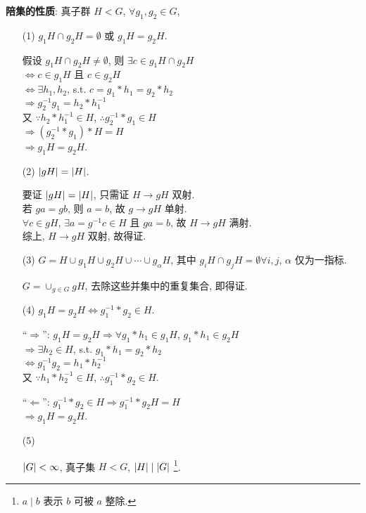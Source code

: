 \documentclass{note}
\begin{document}
\textbf{陪集的性质}: 真子群 $H<G$, $\forall g_1,g_2\in G$,
\begin{itemize}
    \item[(1)] $g_1H\cap g_2H=\emptyset$ 或 $g_1H=g_2H$.
    \begin{pf}
        假设 $g_1H\cap g_2H\neq\emptyset$, 则 $\exists c\in g_1H\cap g_2H$\\
        $\Longleftrightarrow c\in g_1H$ 且 $c\in g_2H$\\
        $\Longleftrightarrow\exists h_1,h_2$, s.t. $c=g_1*h_1=g_2*h_2$\\
        $\Longrightarrow g_2^{-1}g_1=h_2*h_1^{-1}$\\
        又 $\because h_2*h_1^{-1}\in H$, $\therefore g_2^{-1}*g_1\in H$\\
        $\Longrightarrow(g_2^{-1}*g_1)*H=H$\\
        $\Longrightarrow g_1H=g_2H$.
    \end{pf}
    \item[(2)] $\left\lvert gH\right\rvert=\left\lvert H\right\rvert$.
    \begin{pf}
        要证 $\left\lvert gH\right\rvert=\left\lvert H\right\rvert$, 只需证 $H\rightarrow gH$ 双射.\\
        若 $ga=gb$, 则 $a=b$, 故 $g\rightarrow gH$ 单射.\\
        $\forall c\in gH$, $\exists a=g^{-1}c\in H$ 且 $ga=b$, 故 $H\rightarrow gH$ 满射.\\
        综上, $H\rightarrow gH$ 双射, 故得证.
    \end{pf}
    \item[(3)] $G=H\cup g_1H\cup g_2H\cup\cdots\cup g_{\alpha}H$, 其中 $g_iH\cap g_jH=\emptyset\forall i,j$, $\alpha$ 仅为一指标.
    \begin{pf}
        $G=\cup_{g\in G}gH$, 去除这些并集中的重复集合, 即得证.
    \end{pf}
    \item[(4)] $g_1H=g_2H\Longleftrightarrow g_1^{-1}*g_2\in H$.
    \begin{pf}
        ``$\Longrightarrow$'': $g_1H=g_2H\Longrightarrow\forall g_1*h_1\in g_1H$, $g_1*h_1\in g_2H$\\
        $\Longrightarrow\exists h_2\in H$, s.t. $g_1*h_1=g_2*h_2$\\
        $\Longleftrightarrow g_1^{-1}g_2=h_1*h_2^{-1}$\\
        又 $\because h_1*h_2^{-1}\in H$, $\therefore g_1^{-1}*g_2\in H$.

        ``$\Longleftarrow$'': $g_1^{-1}*g_2\in H\Longrightarrow g_1^{-1}*g_2H=H$\\
        $\Longrightarrow g_1H=g_2H$.
    \end{pf}
    \item[(5)] ~\begin{thm}
        $\left\lvert G\right\rvert<\infty$, 真子集 $H<G$, $\left\lvert H\right\rvert\mid\left\lvert G\right\rvert$ \footnote{$a\mid b$ 表示 $b$ 可被 $a$ 整除.}.
    \end{thm}


\end{itemize}
\end{document}
